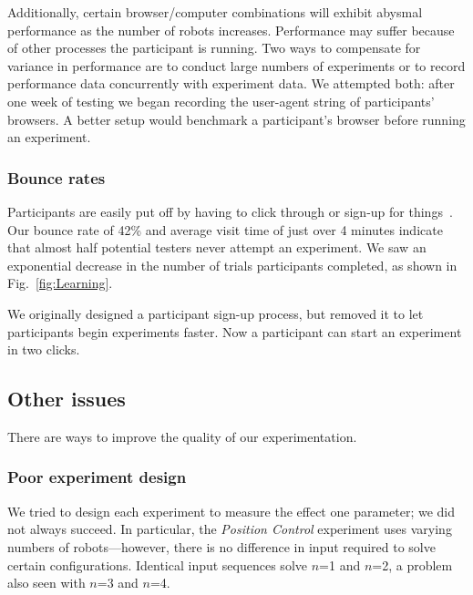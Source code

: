 Additionally, certain browser/computer combinations will exhibit abysmal performance as the number of robots increases. Performance may suffer because of other processes the participant is running. Two ways to compensate for variance in performance are to conduct large numbers of experiments or to record performance data concurrently with experiment data. We attempted both: after one week of testing we began recording the user-agent string of participants' browsers. A better setup would benchmark a participant's browser before running an experiment.


\subsubsection{Bounce rates}
Participants are easily put off by having to click through or sign-up for things~\cite{krug2009don}.  Our bounce rate of 42\% and average visit time of just over 4 minutes indicate that almost half potential testers never attempt an experiment. We saw an exponential decrease in the number of trials participants completed, as shown in Fig.~\ref{fig:Learning}.

We originally designed a participant sign-up process, but removed it to let participants begin experiments faster. Now a participant can start an experiment in two clicks.


\subsection{Other issues}

There are ways to improve the quality of our experimentation.

\subsubsection{Poor experiment design}

We tried to design each experiment to measure the effect one parameter; we did not always succeed. In particular, the \emph{Position Control} experiment uses varying numbers of robots---however, there is no difference in input required to solve certain configurations. Identical input sequences solve $n$=1 and $n$=2, a problem also seen with $n$=3 and $n$=4.

